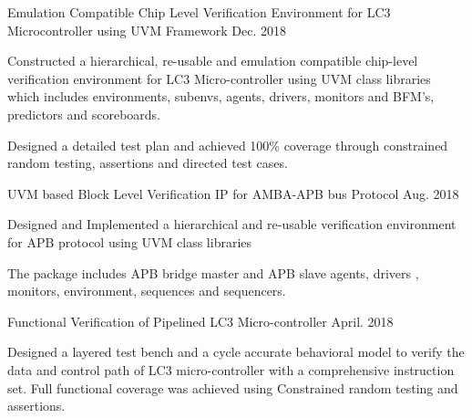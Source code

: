 \par\addvspace{1ex}
\begin{flushleft}
  \par\addvspace{-1.5mm}
  \fontsize{10.4pt}{1em}\selectfont{}
\end{flushleft}
\par\addvspace{-0.5ex}
\begin{cvprojects}
  \cvproject
    {Emulation Compatible Chip Level Verification Environment for LC3 Microcontroller using UVM Framework }
    {\color{darkgray}Dec. 2018}
    {
      \begin{cvprojectitems}
        \item {Constructed a hierarchical, re-usable and emulation compatible chip-level verification environment for LC3 Micro-controller using UVM class libraries which includes environments, subenvs, agents, drivers, monitors and BFM's, predictors and scoreboards.}
        \item {Designed a detailed test plan and achieved 100\% coverage through constrained random testing, assertions and directed test cases.}
      \end{cvprojectitems}
    }

  \cvproject
    {UVM based Block Level Verification IP for AMBA-APB bus Protocol} 
    {\color{darkgray}Aug. 2018}
    {
      \begin{cvprojectitems}
        \item {Designed and Implemented a hierarchical and re-usable verification environment for APB protocol using UVM class libraries}
        \item {The package includes APB bridge master and APB slave agents, drivers , monitors, environment, sequences and sequencers. }
      \end{cvprojectitems}
    }

    \cvproject
    {Functional Verification of Pipelined LC3 Micro-controller} 
    {\color{darkgray}April. 2018}
    {
      \begin{cvprojectitems}
        \item {Designed a layered test bench and a cycle accurate behavioral model to verify the data and control path of LC3 micro-controller with a comprehensive instruction set. Full functional coverage was achieved using Constrained random testing and assertions.}
      \end{cvprojectitems}
    }


\end{cvprojects}
